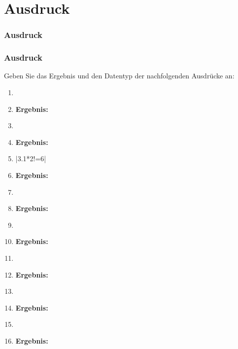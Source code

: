 \def\stitle{Ausdruck}
\section{\stitle}
\begin{frame}
  \frametitle{\stitle}%
\tableofcontents[current]
\end{frame}

\begin{frame}[t]%
    \frametitle{\stitle}
Geben Sie das Ergebnis und den Datentyp der nachfolgenden Ausdrücke an:
\begin{enumerate}
\item {}
\item[] {\bf Ergebnis: }  \dotfill

\item {}
\item[] {\bf Ergebnis: }  \dotfill

\item \code|3.1*2!=6|
\item[] {\bf Ergebnis: }  \dotfill

\item {}
\item[] {\bf Ergebnis: }  \dotfill

\item {}
\item[] {\bf Ergebnis: }  \dotfill

\item {}
\item[] {\bf Ergebnis: }  \dotfill

\item {}
\item[] {\bf Ergebnis: }  \dotfill

\item {}
\item[] {\bf Ergebnis: }  \dotfill
\end{enumerate}
\end{frame}



